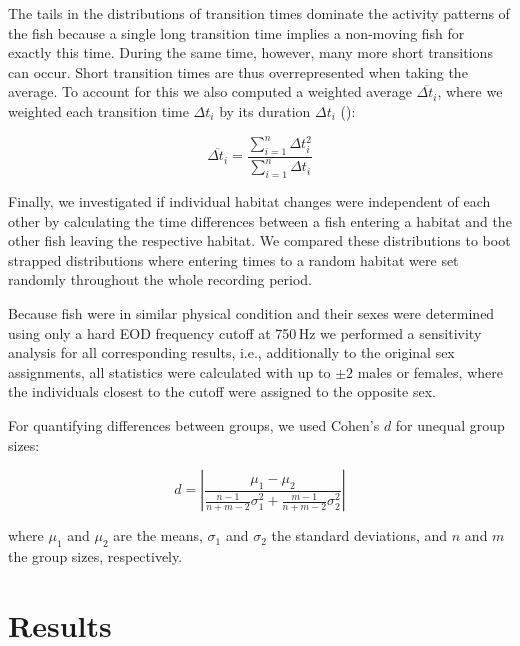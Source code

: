 The tails in the distributions of transition times dominate the activity patterns of the fish because a single long transition time implies a non-moving fish for exactly this time. During the same time, however, many more short transitions can occur. Short transition times are thus overrepresented when taking the average.  To account for this we also computed a weighted average $\overline{\Delta t_i}$, where we weighted each transition time $\Delta t_i$ by its duration $\Delta t_i$ ():
\begin{linenomath}
  \begin{equation}
    \label{weightedtime}
    \overline{\Delta t_i} = \frac{\sum_{i=1}^n \Delta t_i^2}{\sum_{i=1}^n \Delta t_i}
  \end{equation}
\end{linenomath}

Finally, we investigated if individual habitat changes were independent of each other by calculating the time differences between a fish entering a habitat and the other fish leaving the respective habitat. We compared these distributions to boot strapped distributions where entering times to a random habitat were set randomly throughout the whole recording period.

Because fish were in similar physical condition and their sexes were determined using only a hard EOD frequency cutoff at 750\,Hz we performed a sensitivity analysis for all corresponding results, i.e., additionally to the original sex assignments, all
statistics were calculated with up to $\pm 2$ males or females, where the individuals closest to the cutoff were assigned to the opposite sex.

For quantifying differences between groups, we used Cohen's $d$ for unequal group sizes:
\begin{linenomath}
  \begin{equation}
    \label{cohensd}
    d = \left| \frac{\mu_1 - \mu_2}{  \frac{n-1}{n+m-2} \sigma_1^2  +   \frac{m-1}{n+m-2} \sigma_2^2    }    \right|
  \end{equation}
\end{linenomath}
where $\mu_1$ and $\mu_2$ are the means, $\sigma_1$ and $\sigma_2$ the standard deviations, and $n$ and $m$ the group sizes, respectively.

\section{Results}

